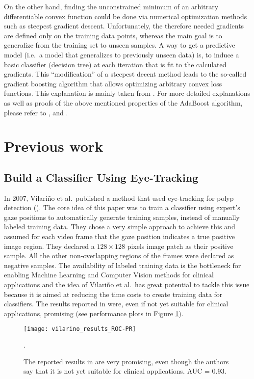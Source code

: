 On the other hand, finding the unconstrained minimum of an arbitrary differentiable convex function could be done via numerical optimization methods such as steepest gradient descent. 
Unfortunately, the therefore needed gradients are defined only on the training data points, whereas the main goal is to generalize from the training set to unseen samples. 
A way to get a predictive model (i.e.\ a model that generalizes to previously unseen data) is, to induce a basic classifier (decision tree) at each iteration that is fit to the calculated gradients. This ``modification'' of a steepest decent method leads to the so-called gradient boosting algorithm that allows optimizing arbitrary convex loss functions.
This explanation is mainly taken from \cite{friedman2009elements}. For more detailed explanations as well as proofs of the above mentioned properties of the AdaBoost algorithm, please refer to \cite[Chapter~10]{friedman2009elements}, \cite{mason1999boosting} and \cite{friedman2001greedy}.

\section{Previous work}
\subsection{Build a Classifier Using Eye-Tracking}
In 2007, Vilari\~no et al.\ published a method that used eye-tracking for polyp detection (\cite{vilarino2007automatic}). 
The core idea of this paper was to train a classifier using expert's gaze positions to automatically generate training samples, instead of manually labeled training data. 
They chose a very simple approach to achieve this and assumed for each video frame that the gaze position indicates a true positive image region. They declared a $128\times128$ pixels image patch as their positive sample. All the other non-overlapping regions of the frames were declared as negative samples.
The availability of labeled training data is the bottleneck for enabling Machine Learning and Computer Vision methods for clinical applications and the idea of Vilari\~no et al.\ has great potential to tackle this issue because it is aimed at reducing the time costs to create training data for classifiers. 
The results reported in \cite{vilarino2007automatic} were, even if not yet suitable for clinical applications, promising (see performance plots in Figure \ref{fig:vilarino-results}).
\begin{figure}[ht]
	\centering
	\texttt{[image: vilarino\_results\_ROC-PR]}
	\caption{The reported results in \cite{vilarino2007automatic} are very promising, even though the authors say that it is not yet suitable for clinical applications. AUC = 0.93.}.
	\label{fig:vilarino-results}
\end{figure}

